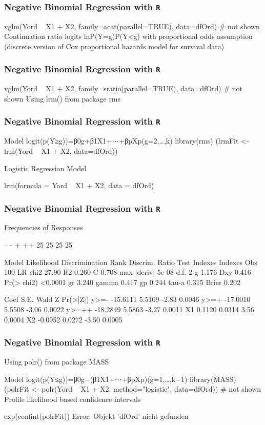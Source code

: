 \begin{frame}[fragile]
	\frametitle{Negative Binomial Regression with \texttt{R} }
	\Large
vglm(Yord ~ X1 + X2, family=acat(parallel=TRUE), data=dfOrd)
# not shown
Continuation ratio logits lnP(Y=g)P(Y<g) with proportional odds assumption (discrete version of Cox proportional hazards model for survival data)
\end{frame}
\begin{frame}[fragile]
	\frametitle{Negative Binomial Regression with \texttt{R} }
	\Large
vglm(Yord ~ X1 + X2, family=sratio(parallel=TRUE), data=dfOrd)
# not shown
Using lrm() from package rms
\end{frame}
\begin{frame}[fragile]
	\frametitle{Negative Binomial Regression with \texttt{R} }
	\Large
Model logit(p(Y≥g))=β0g+β1X1+⋯+βpXp(g=2,…,k)
library(rms)
(lrmFit <- lrm(Yord ~ X1 + X2, data=dfOrd))

Logistic Regression Model

lrm(formula = Yord ~ X1 + X2, data = dfOrd)
\end{frame}
\begin{frame}[fragile]
	\frametitle{Negative Binomial Regression with \texttt{R} }
	\Large
Frequencies of Responses

--  -  + ++ 
25 25 25 25 

                      Model Likelihood     Discrimination    Rank Discrim.    
                         Ratio Test            Indexes          Indexes       
Obs           100    LR chi2      27.90    R2       0.260    C       0.708    
max |deriv| 5e-08    d.f.             2    g        1.176    Dxy     0.416    
                     Pr(> chi2) <0.0001    gr       3.240    gamma   0.417    
                                           gp       0.244    tau-a   0.315    
                                           Brier    0.202                     

      Coef     S.E.   Wald Z Pr(>|Z|)
y>=-  -15.6111 5.5109 -2.83  0.0046  
y>=+  -17.0010 5.5508 -3.06  0.0022  
y>=++ -18.2849 5.5863 -3.27  0.0011  
X1      0.1120 0.0314  3.56  0.0004  
X2     -0.0952 0.0272 -3.50  0.0005  
\end{frame}
\begin{frame}[fragile]
	\frametitle{Negative Binomial Regression with \texttt{R} }
	\Large
Using polr() from package MASS

Model logit(p(Y≤g))=β0g−(β1X1+⋯+βpXp)(g=1,…,k−1)
library(MASS)
(polrFit <- polr(Yord ~ X1 + X2, method="logistic", data=dfOrd))
# not shown
Profile likelihood based confidence intervals

exp(confint(polrFit))
Error: Objekt 'dfOrd' nicht gefunden
\end{frame}
